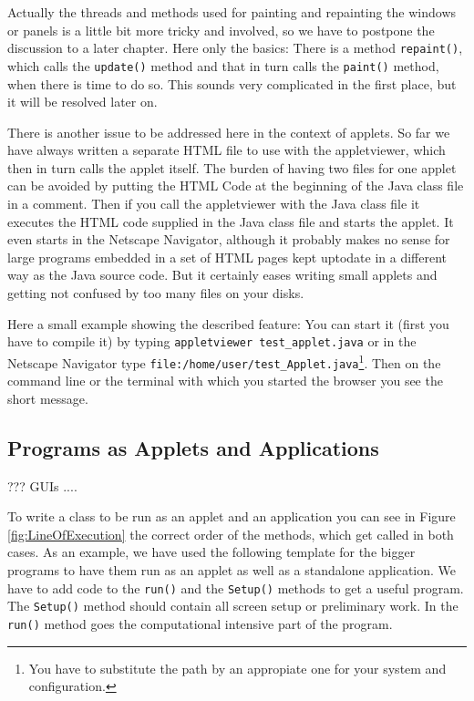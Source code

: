 Actually the threads and methods used for painting and repainting
the windows or panels is a little bit more tricky and involved, so we
have to postpone the discussion to a later chapter. Here only the basics:
There is a method \verb|repaint()|, which calls the \verb|update()|
method and that in turn calls the \verb|paint()| method, when there is time
to do so. This sounds very complicated in the first place, but 
it will be resolved later on.

There is another issue to be addressed here in the context of applets.
So far we have always written a separate HTML file to use with the
appletviewer, which then in turn calls the applet itself. The burden
of having two files for one applet can be avoided by putting the
HTML Code at the beginning of the Java class file in a comment. Then
if you call the appletviewer with the Java class file 
it executes the HTML code supplied
in the Java class file and starts the applet. It even starts in
the Netscape Navigator, although it probably makes no sense for
large programs embedded in a set of HTML pages kept uptodate in a
different way as the Java source code. But it certainly eases
writing small applets and getting not confused by too many files on
your disks. 

Here a small example showing the described feature:
You can start it (first you have to compile it) 
by typing \verb|appletviewer test_applet.java| or 
in the Netscape Navigator type 
\verb|file:/home/user/test_Applet.java|\footnote{You have to substitute 
the path by an appropiate one for your system and configuration.}.
Then on the command line or the terminal with which you started the browser  
you see the short message.


\subsection{Programs as Applets and Applications}

??? GUIs ....

To write a class to be run as an applet and an application
you can see in Figure \ref{fig:LineOfExecution} the correct order
of the methods, which get called in both cases. As an example, 
we have used the following template for the 
bigger programs
to have them run as an applet as well as a standalone application.
We have to add code to the \verb|run()| and the \verb|Setup()| methods
to get a useful program. The  \verb|Setup()| method should contain all
screen setup or preliminary work. In the  \verb|run()| method goes
the computational intensive part of the program.


